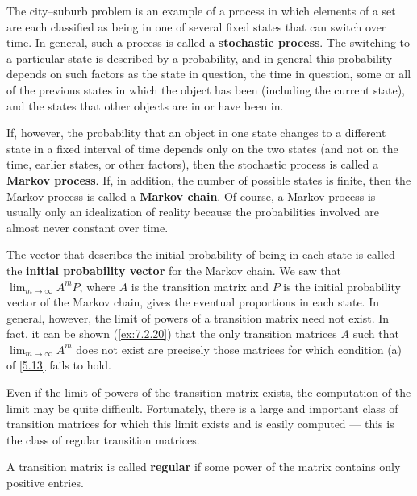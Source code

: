 \begin{defn}\label{5.3.6}
  The city--suburb problem is an example of a process in which elements of a set are each classified as being in one of several fixed states that can switch over time.
  In general, such a process is called a \textbf{stochastic process}.
  The switching to a particular state is described by a probability, and in general this probability depends on such factors as the state in question, the time in question, some or all of the previous states in which the object has been (including the current state), and the states that other objects are in or have been in.

  If, however, the probability that an object in one state changes to a different state in a fixed interval of time depends only on the two states (and not on the time, earlier states, or other factors), then the stochastic process is called a \textbf{Markov process}.
  If, in addition, the number of possible states is finite, then the Markov process is called a \textbf{Markov chain}.
  Of course, a Markov process is usually only an idealization of reality because the probabilities involved are almost never constant over time.

  The vector that describes the initial probability of being in each state is called the \textbf{initial probability vector} for the Markov chain.
  We saw that \(\lim_{m \to \infty} A^m P\), where \(A\) is the transition matrix and \(P\) is the initial probability vector of the Markov chain, gives the eventual proportions in each state.
  In general, however, the limit of powers of a transition matrix need not exist.
  In fact, it can be shown (\cref{ex:7.2.20}) that the only transition matrices \(A\) such that \(\lim_{m \to \infty} A^m\) does not exist are precisely those matrices for which condition (a) of \cref{5.13} fails to hold.
\end{defn}

\begin{note}
  Even if the limit of powers of the transition matrix exists, the computation of the limit may be quite difficult.
  Fortunately, there is a large and important class of transition matrices for which this limit exists and is easily computed
  --- this is the class of regular transition matrices.
\end{note}

\begin{defn}\label{5.3.7}
  A transition matrix is called \textbf{regular} if some power of the matrix contains only positive entries.
\end{defn}

